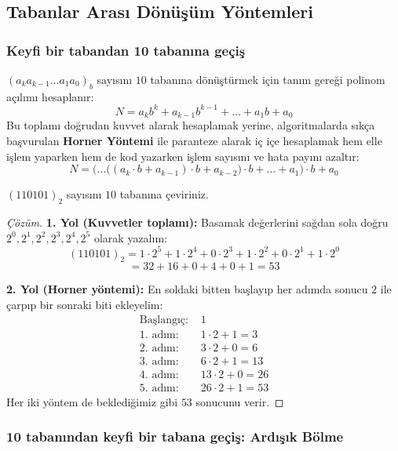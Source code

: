 \subsection{Tabanlar Arası Dönüşüm Yöntemleri}

\subsubsection{Keyfi bir tabandan 10 tabanına geçiş}

$(a_k a_{k-1} \dots a_1 a_0)_b$ sayısını $10$ tabanına dönüştürmek için tanım gereği polinom açılımı hesaplanır:
\[
N = a_k b^k + a_{k-1} b^{k-1} + \dots + a_1 b + a_0
\]
Bu toplamı doğrudan kuvvet alarak hesaplamak yerine, algoritmalarda sıkça başvurulan \textbf{Horner Yöntemi} ile paranteze alarak iç içe hesaplamak hem elle işlem yaparken hem de kod yazarken işlem sayısını ve hata payını azaltır:
\[
N = \Big( \dots \big((a_k \cdot b + a_{k-1}) \cdot b + a_{k-2}\big) \cdot b + \dots + a_1 \Big) \cdot b + a_0
\]

\begin{example}
$(110101)_2$ sayısını $10$ tabanına çeviriniz.
\end{example}

\begin{proof}[Çözüm]
\textbf{1. Yol (Kuvvetler toplamı):}
Basamak değerlerini sağdan sola doğru $2^0, 2^1, 2^2, 2^3, 2^4, 2^5$ olarak yazalım:
\[
(110101)_2 = 1 \cdot 2^5 + 1 \cdot 2^4 + 0 \cdot 2^3 + 1 \cdot 2^2 + 0 \cdot 2^1 + 1 \cdot 2^0
\]
\[
= 32 + 16 + 0 + 4 + 0 + 1 = 53
\]

\textbf{2. Yol (Horner yöntemi):}
En soldaki bitten başlayıp her adımda sonucu $2$ ile çarpıp bir sonraki biti ekleyelim:
\begin{align*}
\text{Başlangıç: } & 1 \\
\text{1. adım: } & 1 \cdot 2 + 1 = 3 \\
\text{2. adım: } & 3 \cdot 2 + 0 = 6 \\
\text{3. adım: } & 6 \cdot 2 + 1 = 13 \\
\text{4. adım: } & 13 \cdot 2 + 0 = 26 \\
\text{5. adım: } & 26 \cdot 2 + 1 = 53
\end{align*}
Her iki yöntem de beklediğimiz gibi $53$ sonucunu verir.
\end{proof}

\subsubsection{10 tabanından keyfi bir tabana geçiş: Ardışık Bölme}

